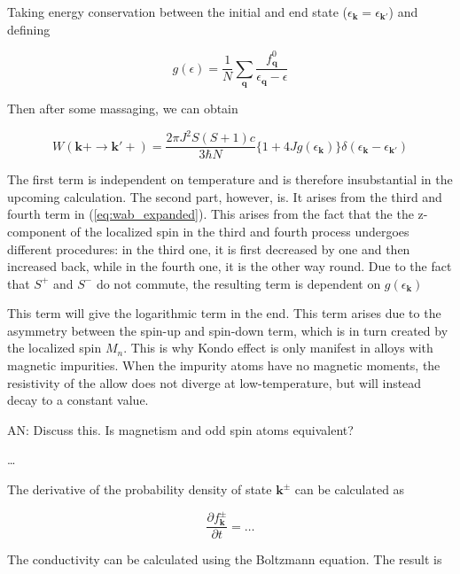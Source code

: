\documentclass{article}
\begin{document}
Taking energy conservation between the initial and end state ($\epsilon_{\bm{k}}=\epsilon_{\bm{k}'}$) and defining

\begin{equation}
    g(\epsilon)=\frac{1}{N}\sum_{\bm{q}} \frac{f^0_{\bm{q}}}{\epsilon_{\bm{q}}-\epsilon}
\end{equation}

Then after some massaging, we can obtain

\begin{equation}
    W(\bm{k}+\rightarrow \bm{k}'+) = \frac{2\pi J^2 S(S+1)c}{3\hbar N}\{1+4J g(\epsilon_{\bm{k}})\}\delta(\epsilon_{\bm{k}}-\epsilon_{\bm{k'}})
\end{equation}

The first term is independent on temperature and is therefore insubstantial in the upcoming calculation. The second part, however, is. It arises from the third and fourth term in (\ref{eq:wab_expanded}). This arises from the fact that the the z-component of the localized spin in the third and fourth process undergoes different procedures: in the third one, it is first decreased by one and then increased back, while in the fourth one, it is the other way round. Due to the fact that $S^+$ and $S^-$ do not commute, the resulting term is dependent on $g(\epsilon_{\bm{k}})$

\iffalse

In the end, there will be a temperature dependent term 

\begin{equation}
    \frac{4J^3}{N^3}\sum_{n} M_n^2\sum_{\bm{q}}\frac{f^0_{\bm{q}}}{\epsilon_{\bm{q}} - \epsilon_{\bm{k}}} 
\end{equation}

\fi

This term will give the logarithmic term in the end. This term arises due to the asymmetry between the spin-up and spin-down term, which is in turn created by the localized spin $M_n$. This is why Kondo effect is only manifest in alloys with magnetic impurities. When the impurity atoms have no magnetic moments, the resistivity of the allow does not diverge at low-temperature, but will instead decay to a constant value.

{\color{red} AN: Discuss this. Is magnetism and odd spin atoms equivalent?}

{\color{red} \dots}

The derivative of the probability density of state $\bm{k}^\pm$ can be calculated as

\begin{equation}
    \frac{\partial f^{\pm}_{\bm{k}}}{\partial t} = \dots
\end{equation}

The conductivity can be calculated using the Boltzmann equation. The result is 
\end{document}

